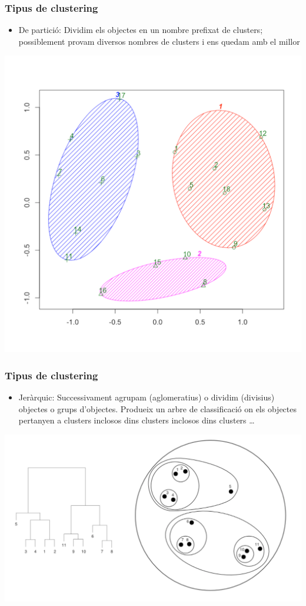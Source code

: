\documentclass[12pt,t]{beamer}
\renewcommand{\emph}[1]{{\color{red}#1}}
\theoremstyle{plain}
\theoremstyle{definition}
\begin{document}
\begin{frame}
\frametitle{Tipus de clustering}

\begin{itemize}
\item \emph{De partició:} Dividim els objectes en un nombre prefixat de clusters; possiblement provam diversos nombres de clusters i ens quedam amb el millor 
\end{itemize}
\vspace*{-1ex}

\begin{center}
\includegraphics[width=0.6\linewidth]{Rplot7.pdf}
\end{center}




\end{frame}



\begin{frame}
\frametitle{Tipus de clustering}

\begin{itemize}
\item \emph{Jeràrquic}: Successivament agrupam (\emph{aglomeratius}) o dividim (\emph{divisius}) objectes o grups d'objectes. Produeix un arbre de classificació on els objectes pertanyen a clusters inclosos dins clusters inclosos dins clusters \ldots
\end{itemize}
\begin{center}
\includegraphics[width=0.7\linewidth]{hclust-example}
\end{center}




\end{frame}
\end{document}
